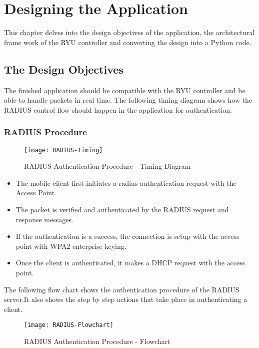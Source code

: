 \chapter{Designing the Application}\label{application}
This chapter delves into the design objectives of the application, the architectural frame work of the RYU controller and converting the design into a Python code.

\section{The Design Objectives}

The finished application should be compatible with the RYU controller and be able to handle packets in real time. The following timing diagram shows how the RADIUS control flow should happen in the application for authentication.

\subsection{RADIUS Procedure} \label{RADIUS_Procedure}

\begin{figure}[H]
	\centering
	\texttt{[image: RADIUS-Timing]}
	\caption {RADIUS Authentication Procedure - Timing Diagram }
	\label{fig:Radius-Timing}
	\vspace{-10pt}
\end{figure}

\begin{itemize}
	\item The mobile client first initiates a radius authentication request with the Access Point.
	\item The packet is verified and authenticated by the RADIUS request and response messages.
	\item If the authentication is a success, the connection is setup with the access point with WPA2 enterprise keying.
	\item Once the client is authenticated, it makes a DHCP request with the access point.   
	
\end{itemize}
The following flow chart shows the authentication procedure of the RADIUS server.It also shows the step by step actions that take place in authenticating a client.
\begin{figure}[H]
	\centering
	\texttt{[image: RADIUS-Flowchart]}
	\caption {RADIUS Authentication Procedure - Flowchart }
	\label{fig:Radius-Flowchart}
	\vspace{-10pt}
\end{figure}
